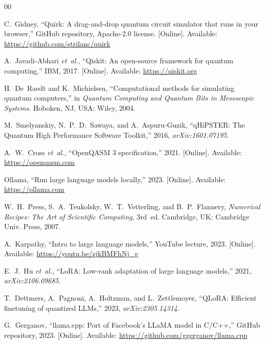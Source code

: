 \documentclass[conference]{IEEEtran}
\begin{document}
\begin{thebibliography}{00}

C.~Gidney, ``Quirk: A drag-and-drop quantum circuit simulator that runs in your browser,'' GitHub repository, Apache-2.0 license. [Online]. Available: \url{https://github.com/strilanc/quirk}

A.~Javadi-Abhari \emph{et~al.}, ``Qiskit: An open-source framework for quantum computing,'' IBM, 2017. [Online]. Available: \url{https://qiskit.org}

H.~De~Raedt and K.~Michielsen, ``Computational methods for simulating quantum computers,'' in \emph{Quantum Computing and Quantum Bits in Mesoscopic Systems}. Hoboken, NJ, USA: Wiley, 2004.

M.~Smelyanskiy, N.~P.~D.~Sawaya, and A.~Aspuru-Guzik, ``qHiPSTER: The Quantum High Performance Software Toolkit,'' 2016, \emph{arXiv:1601.07195}.

A.~W.~Cross \emph{et~al.}, ``OpenQASM 3 specification,'' 2021. [Online]. Available: \url{https://openqasm.com}

Ollama, ``Run large language models locally,'' 2023. [Online]. Available: \url{https://ollama.com}

W.~H.~Press, S.~A.~Teukolsky, W.~T.~Vetterling, and B.~P.~Flannery, \emph{Numerical Recipes: The Art of Scientific Computing}, 3rd~ed. Cambridge, UK: Cambridge Univ. Press, 2007.

A.~Karpathy, ``Intro to large language models,'' YouTube lecture, 2023. [Online]. Available: \url{https://youtu.be/zjkBMFhNj_g}

E.~J.~Hu \emph{et~al.}, ``LoRA: Low-rank adaptation of large language models,'' 2021, \emph{arXiv:2106.09685}.

T.~Dettmers, A.~Pagnoni, A.~Holtzman, and L.~Zettlemoyer, ``QLoRA: Efficient finetuning of quantized LLMs,'' 2023, \emph{arXiv:2305.14314}.

G.~Gerganov, ``llama.cpp: Port of Facebook's LLaMA model in C/C++,'' GitHub repository, 2023. [Online]. Available: \url{https://github.com/ggerganov/llama.cpp}

\end{thebibliography}
\end{document}
